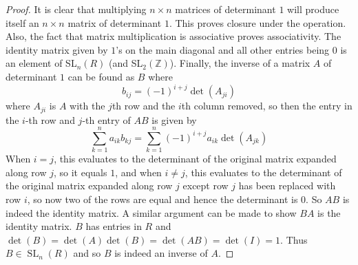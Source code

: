 \documentclass{article}
\theoremstyle{definition}
\theoremstyle{definition}
\theoremstyle{definition}
\begin{document}
\begin{proof}
It is clear that multiplying $n\times n$ matrices of determinant $1$ will produce itself an $n\times n$ matrix of determinant $1$. This proves closure under the operation. Also, the fact that matrix multiplication is associative proves associativity. The identity matrix given by $1$'s on the main diagonal and all other entries being $0$ is an element of SL$_n(R)$ (and SL$_2(\mathbb{Z})$). Finally, the inverse of a matrix $A$ of determinant $1$ can be found as $B$ where
$$b_{ij}=(-1)^{i+j}\det(A_{ji})$$
where $A_{ji}$ is $A$ with the $j$th row and the $i$th column removed, so then the entry in the $i$-th row and $j$-th entry of $AB$ is given by
$$\sum_{k=1}^na_{ik}b_{kj}=\sum_{k=1}^n(-1)^{i+j}a_{ik}\det(A_{jk})$$
When $i=j$, this evaluates to the determinant of the original matrix expanded along row $j$, so it equals $1$, and when $i\neq j$, this evaluates to the determinant of the original matrix expanded along row $j$ except row $j$ has been replaced with row $i$, so now two of the rows are equal and hence the determinant is $0$. So $AB$ is indeed the identity matrix. A similar argument can be made to show $BA$ is the identity matrix. $B$ has entries in $R$ and $\det(B)=\det(A)\det(B)=\det(AB)=\det(I)=1$. Thus $B\in\operatorname{SL}_n(R)$ and so $B$ is indeed an inverse of $A$.
\end{proof}
\end{document}
